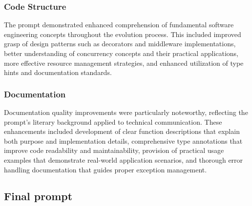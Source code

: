 \documentclass[10pt,a4paper,twocolumn]{article}
\begin{document}
\begin{appendices}
\subsubsection{Code Structure}

The prompt demonstrated enhanced comprehension of fundamental software engineering concepts throughout the evolution process. This included improved grasp of design patterns such as decorators and middleware implementations, better understanding of concurrency concepts and their practical applications, more effective resource management strategies, and enhanced utilization of type hints and documentation standards.

\subsubsection{Documentation}

Documentation quality improvements were particularly noteworthy, reflecting the prompt's literary background applied to technical communication. These enhancements included development of clear function descriptions that explain both purpose and implementation details, comprehensive type annotations that improve code readability and maintainability, provision of practical usage examples that demonstrate real-world application scenarios, and thorough error handling documentation that guides proper exception management.


\subsection{Final prompt}

\begin{tt}


\end{tt}
\end{appendices}
\end{document}
